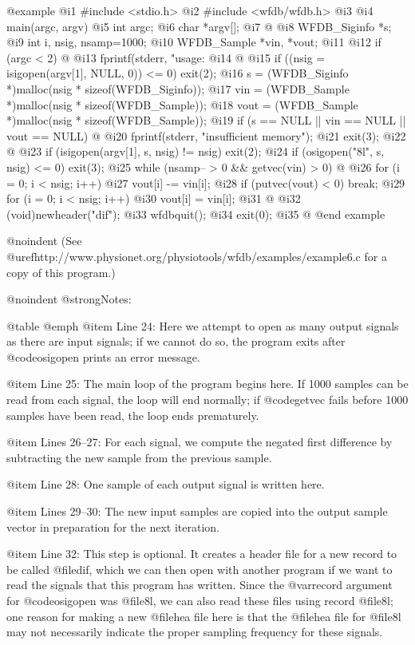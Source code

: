 {{{{{{{{{{@example
 @i{1}  #include <stdio.h>
 @i{2}  #include <wfdb/wfdb.h>
 @i{3}  
 @i{4}  main(argc, argv)
 @i{5}  int argc;
 @i{6}  char *argv[];
 @i{7}  @{
 @i{8}      WFDB_Siginfo *s;
 @i{9}      int i, nsig, nsamp=1000;
@i{10}      WFDB_Sample *vin, *vout;
@i{11}  
@i{12}      if (argc < 2) @{
@i{13}          fprintf(stderr, "usage: %
@i{14}      @}
@i{15}      if ((nsig = isigopen(argv[1], NULL, 0)) <= 0) exit(2);
@i{16}      s = (WFDB_Siginfo *)malloc(nsig * sizeof(WFDB_Siginfo));
@i{17}      vin = (WFDB_Sample *)malloc(nsig * sizeof(WFDB_Sample));
@i{18}      vout = (WFDB_Sample *)malloc(nsig * sizeof(WFDB_Sample));
@i{19}      if (s == NULL || vin == NULL || vout == NULL) @{
@i{20}          fprintf(stderr, "insufficient memory\n");
@i{21}          exit(3);
@i{22}      @}
@i{23}      if (isigopen(argv[1], s, nsig) != nsig) exit(2);
@i{24}      if (osigopen("8l", s, nsig) <= 0) exit(3);
@i{25}      while (nsamp-- > 0 && getvec(vin) > 0) @{
@i{26}          for (i = 0; i < nsig; i++)
@i{27}              vout[i] -= vin[i];
@i{28}          if (putvec(vout) < 0) break;
@i{29}          for (i = 0; i < nsig; i++)
@i{30}              vout[i] = vin[i];
@i{31}      @}
@i{32}      (void)newheader("dif");
@i{33}      wfdbquit();
@i{34}      exit(0);
@i{35}  @}
@end example

@noindent
(See @uref{http://www.physionet.org/physiotools/wfdb/examples/example6.c}
for a copy of this program.)

@noindent
@strong{Notes:}

@table @emph
@item Line 24:
Here we attempt to open as many output signals as there are input
signals; if we cannot do so, the program exits after @code{osigopen}
prints an error message.

@item Line 25:
The main loop of the program begins here.  If 1000 samples can be read
from each signal, the loop will end normally; if @code{getvec} fails
before 1000 samples have been read, the loop ends prematurely.

@item Lines 26--27:
For each signal, we compute the negated first difference by subtracting
the new sample from the previous sample.

@item Line 28:
One sample of each output signal is written here.

@item Lines 29--30:
The new input samples are copied into the output sample vector in preparation
for the next iteration.

@item Line 32:
This step is optional.  It creates a header file for a new record
to be called @file{dif}, which we can then open with another program if
we want to read the signals that this program has written.  Since the
@var{record} argument for @code{osigopen} was @file{8l}, we can also
read these files using record @file{8l}; one reason for making a new
@file{hea} file here is that the @file{hea} file for @file{8l} may
not necessarily indicate the proper sampling frequency for these
signals.

}}}}}}}}}}
